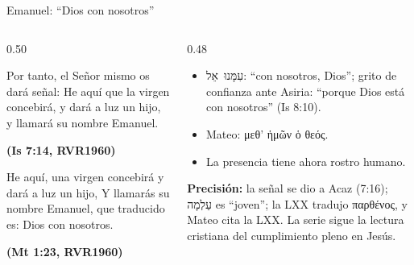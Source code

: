 \documentclass[hyperref={bookmarks=false},aspectratio=169]{beamer}
\newcommand{\heb}[1]{\mbox{\foreignlanguage{hebrew}{#1}}}
\newcommand{\grc}[1]{\foreignlanguage{ancientgreek}{#1}}
\newcommand{\fuente}[1]{\par\hfill{\upshape\bfseries\footnotesize\textcolor{azul}{#1}}}
\newcommand{\precision}[1]{{\footnotesize\color{gris}\textbf{Precisión:} #1}}
\begin{document}
\begin{frame}{Emanuel: ``Dios con nosotros''}
\begin{columns}[t,onlytextwidth]
\begin{column}{0.50\textwidth}
\begin{cita}[fontupper=\scriptsize\itshape]Por tanto, el Señor mismo os dará señal: He aquí que la virgen concebirá, y dará a luz un hijo, y llamará su nombre Emanuel.\fuente{(Is 7:14, RVR1960)}\end{cita}
\begin{cita}[fontupper=\scriptsize\itshape]He aquí, una virgen concebirá y dará a luz un hijo, Y llamarás su nombre Emanuel, que traducido es: Dios con nosotros.\fuente{(Mt 1:23, RVR1960)}\end{cita}
\end{column}
\begin{column}{0.48\textwidth}\small
\begin{itemize}
\item \heb{עִמָּנוּ אֵל}: ``con nosotros, Dios''; grito de confianza ante Asiria: ``porque Dios está con nosotros'' (Is 8:10).
\item Mateo: \grc{μεθ’ ἡμῶν ὁ θεός}.
\item La presencia tiene ahora rostro humano.
\end{itemize}
\precision{la señal se dio a Acaz (7:16); \heb{עַלְמָה} es ``joven''; la LXX tradujo \grc{παρθένος}, y Mateo cita la LXX. La serie sigue la lectura cristiana del cumplimiento pleno en Jesús.}
\end{column}
\end{columns}
\end{frame}
\end{document}
